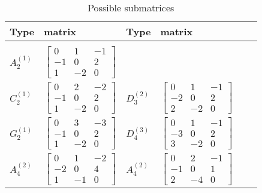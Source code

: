 \documentclass{amsart}
\numberwithin{theorem}{section}
\begin{document}
	\begin{table}
	\caption{Possible submatrices}
	\label{tab:possible_submatrices}	
	\begin{center}
	\begin{tabular}{|ll|ll|ll|}
	Type & matrix & Type & matrix \\
	\hline & & & \\[-1ex]
	$A_{2}^{(1)}$ & $\left[\begin{array}{rrr}
	0 & 1 & -1 \\
	-1 & 0 & 2 \\
	1 & -2 & 0
	\end{array}\right]$ & & \\[4ex]
	$C_{2}^{(1)}$ & $\left[\begin{array}{rrr}
	0 & 2 & -2 \\
	-1 & 0 & 2 \\
	1 & -2 & 0
	\end{array}\right]$ &
	$D_{3}^{(2)}$ & $\left[\begin{array}{rrr}
	0 & 1 & -1 \\
	-2 & 0 & 2 \\
	2 & -2 & 0
	\end{array}\right]$ \\[4ex]
	$G_2^{(1)}$ & $\left[\begin{array}{rrr}
	0 & 3 & -3 \\
	-1 & 0 & 2 \\
	1 & -2 & 0
	\end{array}\right]$ &
	$D_4^{(3)}$ & $\left[\begin{array}{rrr}
	0 & 1 & -1 \\
	-3 & 0 & 2 \\
	3 & -2 & 0
	\end{array}\right]$ \\[4ex]
	$A_{4}^{(2)}$ & $\left[\begin{array}{rrr}
	0 & 1 & -2 \\
	-2 & 0 & 4 \\
	1 & -1 & 0
	\end{array}\right]$ &
	$A_{4}^{(2)}$ & $\left[\begin{array}{rrr}
	0 & 2 & -1 \\
	-1 & 0 & 1 \\
	2 & -4 & 0
	\end{array}\right]$ 
	\end{tabular}
	\end{center}	
	\end{table}
\end{document}
